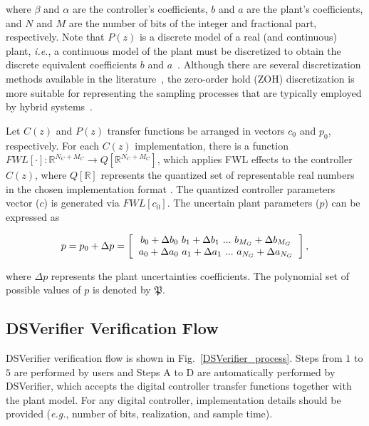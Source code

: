 \documentclass{sig-alternate-05-2015}
\begin{document}
\noindent where $\beta$ and $\alpha$ are the controller's coefficients, $b$ and $a$ are the plant's coefficients, and $N$ and $M$ are the number of bits of the integer and fractional part, respectively. Note that $P(z)$ is a discrete model of a real (and continuous) plant, {\it i.e.}, a continuous model of the plant must be discretized to obtain the discrete equivalent coefficients $b$ and $a$~\cite{Astrom08}. Although there are several discretization methods available in the literature~\cite{Franklin15}, the zero-order hold (ZOH) discretization is more suitable for representing the sampling processes that are typically employed by hybrid systems~\cite{istepanian2012digital}.

Let $C(z)$ and $P(z)$ transfer functions be arranged in vectors $c_0$ and $p_0$, respectively.
For each $C(z)$ implementation, there is a function $FWL[\cdot]:\mathbb{R}^{N_C+M_C}\rightarrow Q[\mathbb{R}^{N_C+M_C}]$, which applies FWL effects to the controller $C(z)$, where $Q[\mathbb{R}]$ represents the quantized set of representable real numbers in the chosen implementation format . The quantized controller parameters vector ($c$) is generated via $FWL[c_0]$. The uncertain plant parameters ($p$) can be expressed as

\begin{equation}
p = p_0 + \Delta{p} = \left [
				\begin{tabular}{c}
				$b_{0}+\Delta{b_{0}} ~ b_{1}+\Delta{b_{1}} ~ ... ~ b_{M_G}+\Delta{b_{M_G}}$ \\%
				$a_{0}+\Delta{a_{0}} ~ a_{1}+\Delta{a_{1}} ~ ... ~ a_{N_G}+\Delta{a_{N_G}}$
				\end{tabular}
				\right ],
\end{equation}
 
\vspace{1 mm} 
\noindent where $\Delta{p}$ represents the plant uncertainties coefficients. The polynomial set of possible values of $p$ is denoted by $\mathfrak{P}$.

\subsection{DSVerifier Verification Flow}
\label{verification-flow}

DSVerifier verification flow is shown in Fig.~\ref{DSVerifier_process}. Steps from $1$ to $5$ are performed by users and Steps A to D are automatically performed by DSVerifier, which accepts the digital controller transfer functions together with the plant model. For any digital controller, implementation details should be provided ({\it e.g.}, number of bits, realization, and sample time).
\end{document}
